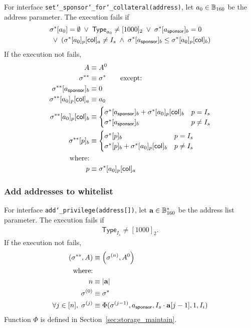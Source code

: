 For interface {\tt set\char`_sponsor\char`_for\char`_collateral(address)}, let $a_0\in \mathbb{B}_{160}$ be the address parameter. The execution fails if 
	\begin{align}
		& \mathbf{\sigma}^*[a_0]=\emptyset \;\vee\; \mathsf{Type}_{a_0}\neq[1000]_2 \;\vee\; \mathbf{\sigma}^*[a_{\sf sponsor}]_b = 0  \notag \\ 
		& \;\vee\; (\mathbf{\sigma}^*[a_0]_p[{\sf col}]_a \neq I_s \;\wedge\; \mathbf{\sigma}^*[a_{\sf sponsor}]_b\le \mathbf{\sigma}^*[a_0]_p[{\sf col}]_b)  
	\end{align}
	If the execution not fails, 
		\begin{align}
			A & \equiv A^0 \\
			\mathbf{\sigma}^{**} &\equiv \mathbf{\sigma}^* \qquad \mbox{except:}\\
			\mathbf{\sigma}^{**}[a_{\sf sponsor}]_b &\equiv 0 \\ 
			\mathbf{\sigma}^{**}[a_0]_p[{\sf col}]_a &\equiv a_0\\ 
			\mathbf{\sigma}^{**}[a_0]_p[{\sf col}]_b &\equiv \begin{cases}
				\mathbf{\sigma}^*[a_{\sf sponsor}]_b + \mathbf{\sigma}^*[a_0]_p[{\sf col}]_b& p = I_s\\ 
				\mathbf{\sigma}^*[a_{\sf sponsor}]_b& p \neq I_s
			\end{cases}\\ 
			\mathbf{\sigma}^{**}[p]_b &\equiv \begin{cases}
				\mathbf{\sigma}^*[p]_b & p = I_s\\ 
				\mathbf{\sigma}^*[p]_b + \mathbf{\sigma}^*[a_0]_p[{\sf col}]_b& p \neq I_s
			\end{cases}\\
			\mbox{where:}& \\
			p & \equiv \mathbf{\sigma}^*[a_0]_p[{\sf col}]_a
        \end{align}
        
\subsubsection{Add addresses to whitelist}

For interface {\tt add\char`_privilege(address[])}, let $\mathbf{a}\in \mathbb{B}_{160}^*$ be the address list parameter. The execution fails if \begin{align}
		\mathsf{Type}_{I_s}\neq[1000]_2. 
	\end{align}
	If the execution not fails,
	\begin{align}
		\left(\mathbf{\sigma}^{**}, A\right) &\equiv \left(\mathbf{\sigma}^{(n)}, A^0\right)\\ 
		\mbox{where:} &\\
		n&\equiv |\mathbf{a}| \\
		\mathbf{\sigma}^{(0)} &\equiv \mathbf{\sigma}^* \\ 
		\forall j \in [n],\; \mathbf{\sigma}^{(j)} &\equiv \Phi(\mathbf{\sigma}^{(j-1)},a_{\sf sponsor},I_s\cdot {\bf a}[j-1],1,I_i)
	\end{align}
	Function $\Phi$ is defined in Section~\ref{sec:storage_maintain}.
    
